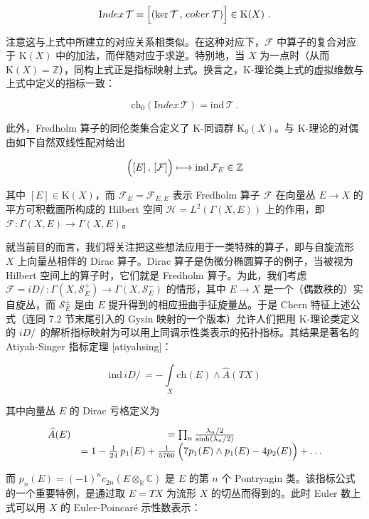 \documentclass[11pt,a4paper]{ctexart}
\begin{document}
\[{\mathrm Index}\,{\mathcal T}\equiv\Bigl[(\ker{\mathcal T}\,,\,
{\mathrm coker}\,{\mathcal T})\Bigr]\in {\mathrm K}(X)\ .\]

注意这与上式中所建立的对应关系相类似。在这种对应下，\({\mathcal F}\) 中算子的复合对应于 \({\mathrm K}(X)\) 中的加法，而伴随对应于求逆。特别地，当 \(X\) 为一点时（从而 \({\mathrm K}(X)={\mathbb{Z}}\)），同构上式正是指标映射上式。换言之，K-理论类上式的虚拟维数与上式中定义的指标一致：

\[\mathrm{ch}_0({\mathrm Index}\,{\mathcal T})
=\mathrm{ind}\,{\mathcal T}\ .\]

此外，Fredholm 算子的同伦类集合定义了 K-同调群 \({\mathrm K}_0(X)\)。与 K-理论的对偶由如下自然双线性配对给出

\[\Bigl([E]\,,\,[{\mathcal F}]\Bigr)\longmapsto\mathrm{ind}\,{\mathcal F}_{E}\in{\mathbb{Z}}\]

其中 \([E]\in{\mathrm K}(X)\)，而 \({\mathcal F}_E={\mathcal F}_{E,E}\) 表示 Fredholm 算子 \({\mathcal F}\) 在向量丛 \(E\to X\) 的平方可积截面所构成的 Hilbert 空间 \({\mathcal H}=L^2(\Gamma(X,E))\) 上的作用，即 \({\mathcal F}:\Gamma(X,E)\to\Gamma(X,E)\)。

就当前目的而言，我们将关注把这些想法应用于一类特殊的算子，即与自旋流形 \(X\) 上向量丛相伴的 Dirac 算子。Dirac 算子是伪微分椭圆算子的例子，当被视为 Hilbert 空间上的算子时，它们就是 Fredholm 算子。为此，我们考虑 \({\mathcal F}=iD/\,:\Gamma(X,{\mathcal S}_E^+)\to\Gamma(X,{\mathcal S}_E^-)\) 的情形，其中 \(E\to X\) 是一个（偶数秩的）实自旋丛，而 \({\mathcal S}_E^\pm\) 是由 \(E\) 提升得到的相应扭曲手征旋量丛。于是 Chern 特征上述公式（连同 7.2 节末尾引入的 Gysin 映射的一个版本）允许人们把用 K-理论类定义的 \(iD/\,\) 的解析指标映射为可以用上同调示性类表示的拓扑指标。其结果是著名的 Atiyah-Singer 指标定理 [atiyahsing]：

\[\mathrm{ind}\,iD/\,=-\int\limits_X\mathrm{ch}(E)\wedge\widehat{A}(TX)\]

其中向量丛 \(E\) 的 Dirac 亏格定义为

\[\begin{matrix}
\widehat{A}(E)&=\prod_n\frac{\lambda_n/2}{\sinh(\lambda_n/2)}\\
&=1-\frac1{24}\,p_1(E)+\frac1{5760}
\,\Bigl(7p_1(E)\wedge p_1(E)-4p_2(E)\Bigr)+\dots
\end{matrix}\]

而 \(p_n(E)=(-1)^nc_{2n}(E\otimes_{\mathbb{R}}{\mathbb{C}})\) 是 \(E\) 的第 \(n\) 个 Pontryagin 类。该指标公式的一个重要特例，是通过取 \(E=TX\) 为流形 \(X\) 的切丛而得到的。此时 Euler 数上式可以用 \(X\) 的 Euler-Poincaré 示性数表示：
\end{document}
